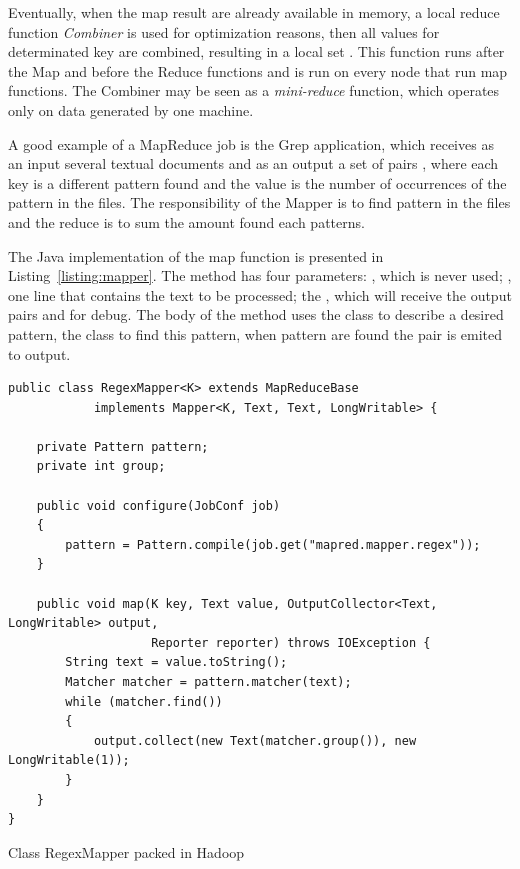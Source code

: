Eventually, when the map result are already available in memory, a local reduce
function \emph{Combiner} is used for optimization reasons, then all values for
determinated key are combined, resulting in a local set .
This function runs after the Map and before the Reduce functions and is run on
every node that run map functions. The Combiner may be seen as a \emph{mini-reduce}
function, which operates only on data generated by one machine.

A good example of a MapReduce job is the Grep application, which receives as an
input several textual documents and as an output a set of pairs ,
where each key is a different pattern found and the value is the number of occurrences 
of the pattern in the files. The responsibility of the Mapper is to find pattern
in the files and the reduce is to sum the amount found each patterns.

The Java implementation of the map function is presented in Listing~\ref{listing:mapper}. 
The  method has four parameters: , which is never used; ,
one line that contains the text to be processed; the , which will receive
the output pairs and  for debug. The body of the method uses the class
 to describe a desired pattern, the class  to find this
pattern, when pattern are found the pair  is emited to
output.

\singlespacing
\begin{listing}[H]
\begin{verbatim}
public class RegexMapper<K> extends MapReduceBase
			implements Mapper<K, Text, Text, LongWritable> {

    private Pattern pattern;
    private int group;

    public void configure(JobConf job)
    {
        pattern = Pattern.compile(job.get("mapred.mapper.regex"));
    }

    public void map(K key, Text value, OutputCollector<Text, LongWritable> output,
					Reporter reporter) throws IOException {
        String text = value.toString();
        Matcher matcher = pattern.matcher(text);
        while (matcher.find())
        {
            output.collect(new Text(matcher.group()), new LongWritable(1));
        }
    }
}
\end{verbatim}
\caption{Class RegexMapper packed in Hadoop~\cite{hadoop}} 
\label{listing:mapper}
\end{listing}


